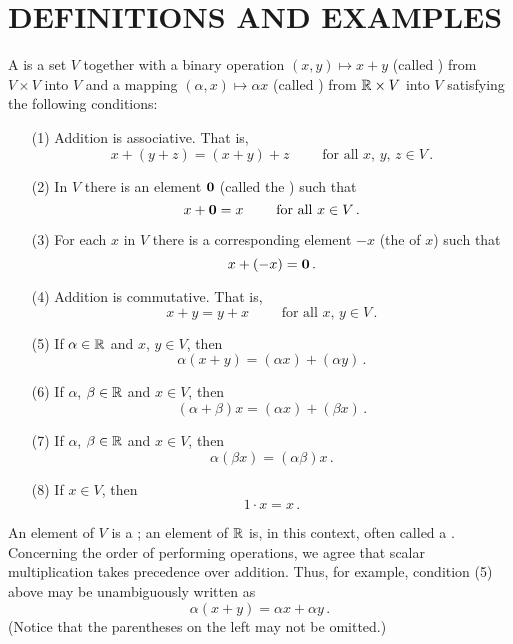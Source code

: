 \section{DEFINITIONS AND EXAMPLES}
\begin{defn}\label{vs_def1} A
 is a set $V$ together with a binary operation $(x,y) \mapsto x + y$
(called ) from $V \times V$ into $V$ and a mapping $(\alpha,x) \mapsto \alpha x$
(called ) from $\mathbb{R} \times V$ into $V$ satisfying the following
conditions:
 \begin{enumerate}
  \item[(1)]  Addition is associative. That is,
     \[ x + (y + z) = (x + y) + z  \qquad\text{ for all $x$, $y$, $z \in V$}\,. \]
  \item[(2)] In $V$ there is an element $\mathbf{0}$ (called the
) such that
     \[ x + \mathbf{0} = x  \qquad\text{ for all $x \in V$}\,. \]
  \item[(3)] For each $x$ in $V$ there is a corresponding element
$-x$ (the
 of $x$) such that
     \[ x + (-x) = \mathbf{0}\,. \]
  \item[(4)] Addition is commutative. That is,
     \[ x + y = y + x   \qquad\text{ for all $x$, $y \in V$}\,. \]
  \item[(5)] If $\alpha \in \mathbb{R}$ and $x$, $y \in V$, then
     \[ \alpha(x + y) = (\alpha x) + (\alpha y)\,. \]
  \item[(6)] If $\alpha$, $\beta \in \mathbb{R}$ and $x \in V$, then
     \[ (\alpha + \beta)x = (\alpha x) + (\beta x)\,. \]
  \item[(7)] If $\alpha$, $\beta \in \mathbb{R}$ and $x \in V$, then
     \[ \alpha(\beta x) = (\alpha\beta)x\,. \]
  \item[(8)] If $x \in V$, then
     \[ 1 \cdot x = x\,. \]
 \end{enumerate}
\end{defn}

An element of $V$ is a
; an element of $\mathbb{R}$ is, in this context, often called a
.  Concerning the order of performing operations, we agree that scalar
multiplication takes precedence over addition. Thus, for example, condition (5) above may be
unambiguously written as
 \[ \alpha(x + y) = \alpha x + \alpha y\,. \]
(Notice that the parentheses on the left may not be omitted.)

